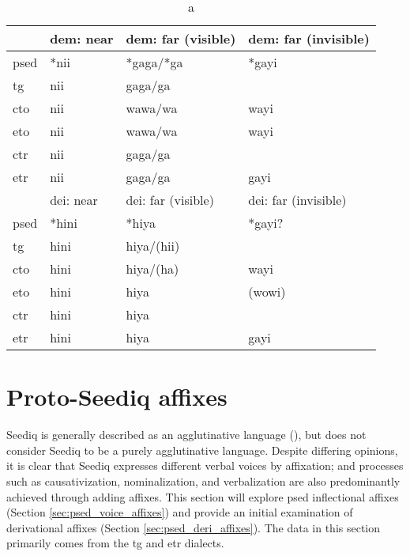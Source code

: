 \begin{table}[!htbp]
\centering
\caption{a}
\label{tab:sed_dia_dem_dei}
\begin{tabular}{llll}
\hline
           & \acs{dem}: near & \acs{dem}: far (visible) & \acs{dem}: far (invisible) \\ \hline
\acs{psed} & *nii            & *gaga/*ga                & *gayi                      \\
\acs{tg}   & nii             & gaga/ga                  &                            \\
\acs{cto}  & nii             & wawa/wa                  & wayi                       \\
\acs{eto}  & nii             & wawa/wa                  & wayi                       \\
\acs{ctr}  & nii             & gaga/ga                  &                            \\
\acs{etr}  & nii             & gaga/ga                  & gayi                       \\ \hline\hline
           & \acs{dei}: near & \acs{dei}: far (visible) & \acs{dei}: far (invisible) \\ \hline
\acs{psed} & *hini           & *hiya                    & *gayi?                     \\
\acs{tg}   & hini            & hiya/(hii)               &                            \\
\acs{cto}  & hini            & hiya/(ha)                & wayi                       \\
\acs{eto}  & hini            & hiya                     & (wowi)                     \\
\acs{ctr}  & hini            & hiya                     &                            \\
\acs{etr}  & hini            & hiya                     & gayi                       \\ \hline
\end{tabular}
\end{table}

\lipsum[1-10]

\section{Proto-Seediq affixes} \label{sec:psed_aff}

Seediq is generally described as an agglutinative language (\cite{tsukida2012}), but \textcite{holmer1996parametric} does not consider Seediq to be a purely agglutinative language. Despite differing opinions, it is clear that Seediq expresses different verbal voices by affixation; and processes such as causativization, nominalization, and verbalization are also predominantly achieved through adding affixes. This section will explore \acl{psed} inflectional affixes (Section \ref{sec:psed_voice_affixes}) and provide an initial examination of derivational affixes (Section \ref{sec:psed_deri_affixes}). The data in this section primarily comes from the \acl{tg} and \acl{etr} dialects.

